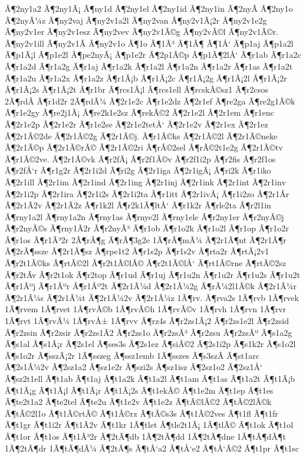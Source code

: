 {Ã¶2ny1a2
Ã¶2ny1Ã¡
Ã¶ny1d
Ã¶2ny1el
Ã¶2ny1id
Ã¶2ny1in
Ã¶2nyÃ­
Ã¶2ny1o
Ã¶2nyÃ¼z
Ã¶ny2vaj
Ã¶ny2v1a2l
Ã¶ny2van
Ã¶ny2v1Ã¡2r
Ã¶ny2v1e2g
Ã¶ny2v1er
Ã¶ny2v1esz
Ã¶ny2vev
Ã¶ny2v1Ã©g
Ã¶ny2vÃ©l
Ã¶ny2v1Ã©r.
Ã¶ny2v1ill
Ã¶ny2v1Ã­
Ã¶ny2v1o
Ã¶1o
Ã¶1Ã³
Ã¶1Ã¶
Ã¶1Å‘
Ã¶p1aj
Ã¶p1a2l
Ã¶p1Ã¡l
Ã¶p1e2l
Ã¶pe2nyÃ¡
Ã¶p1e2r
Ã¶2p1Ã©p
Ã¶p1Ã¶2lÅ‘
Ã¶r1ab
Ã¶r1a2c
Ã¶r1a2d
Ã¶r1a2g
Ã¶r1aj
Ã¶r1a2k
Ã¶r1a2l
Ã¶r1a2n
Ã¶r1a2r
Ã¶r1as
Ã¶r1a2t
Ã¶r1a2u
Ã¶r1a2x
Ã¶r1a2z
Ã¶r1Ã¡b
Ã¶r1Ã¡2c
Ã¶r1Ã¡2g
Ã¶r1Ã¡2l
Ã¶r1Ã¡2r
Ã¶r1Ã¡2s
Ã¶r1Ã¡2t
Ã¶r1br
Ã¶rcs1Ã¡l
Ã¶rcs1ell
Ã¶rcskÃ©sz1
Ã¶r2csos
2Ã¶rdÃ­
Ã¶r1d2r
2Ã¶rdÃ¼
Ã¶2r1e2c
Ã¶r1e2dz
Ã¶2r1ef
Ã¶re2ga
Ã¶re2g1Ã©k
Ã¶r1e2gy
Ã¶re2j1Ã¡
Ã¶re2k1e2sz
Ã¶rekÃ©2
Ã¶2r1e2l
Ã¶2r1em
Ã¶r1enc
Ã¶2r1e2p
Ã¶2r1e2r
Ã¶r1e2se
Ã¶2r1e2tetÅ‘
Ã¶2r1e2v
Ã¶2r1ex
Ã¶2r1ez
Ã¶2r1Ã©2de
Ã¶2r1Ã©2g
Ã¶2r1Ã©j.
Ã¶r1Ã©ks
Ã¶2r1Ã©2l
Ã¶2r1Ã©neke
Ã¶2r1Ã©p
Ã¶2r1Ã©rÃ©
Ã¶2r1Ã©2ri
Ã¶rÃ©2sel
Ã¶rÃ©2t1e2g
Ã¶2r1Ã©tv
Ã¶r1Ã©2ve.
Ã¶2r1Ã©vk
Ã¶r2fÃ¡
Ã¶r2f1Ã©v
Ã¶r2f1i2p
Ã¶r2fis
Ã¶r2f1os
Ã¶r2fÅ‘r
Ã¶r1g2r
Ã¶2r1i2d
Ã¶ri2g
Ã¶2r1iga
Ã¶2r1igÃ¡
Ã¶ri2k
Ã¶r1iko
Ã¶2r1ill
Ã¶2r1im
Ã¶2r1ind
Ã¶2r1ing
Ã¶2r1inj
Ã¶2r1ink
Ã¶2r1int
Ã¶2r1inv
Ã¶2r1i2p
Ã¶2r1ira
Ã¶2r1i2s
Ã¶2r1i2ta
Ã¶r1itt
Ã¶2r1ivÃ¡
Ã¶r1i2zo
Ã¶2r1Ã­r
Ã¶2r1Ã­2v
Ã¶2r1Ã­2z
Ã¶r1k2l
Ã¶r2k1Ã¶ltÅ‘
Ã¶r1k2r
Ã¶rle2ta
Ã¶r2l1in
Ã¶rny1a2l
Ã¶rny1a2n
Ã¶rny1as
Ã¶rnye2l
Ã¶rny1ele
Ã¶r2ny1er
Ã¶r2nyÃ©j
Ã¶r2nyÃ©s
Ã¶rny1Ã­2r
Ã¶r2nyÃ³
Ã¶r1ob
Ã¶r1o2k
Ã¶r1o2l
Ã¶r1op
Ã¶r1o2r
Ã¶r1os
Ã¶r1Ã³2r
2Ã¶rÃ¶g
Ã¶rÃ¶3g2e
1Ã¶rÃ¶mÃ¼
Ã¶2r1Ã¶nt
Ã¶2r1Ã¶r
Ã¶2rÃ¶ssze
Ã¶2r1Ã¶sz
Ã¶rpe1t2
Ã¶r1s2p
Ã¶r1s2v
Ã¶rta2r
Ã¶rtÃ¡2v1
Ã¶r2t1Ã©ks
Ã¶rtÃ©2l
Ã¶r2t1Ã©lÃ©
Ã¶r2t1Ã©lÅ‘
Ã¶rt1Ã©rne
Ã¶rtÃ©2sz
Ã¶r2tÃ­v
Ã¶r2t1ok
Ã¶r2top
Ã¶r1ud
Ã¶r1uj
Ã¶r1u2n
Ã¶r1u2r
Ã¶r1u2s
Ã¶r1u2t
Ã¶r1Ãºj
Ã¶r1Ãºr
Ã¶r1Ãº2t
Ã¶2r1Ã¼d
Ã¶2r1Ã¼2g
Ã¶rÃ¼2l1Ã©k
Ã¶2r1Ã¼r
Ã¶2r1Ã¼s
Ã¶2r1Ã¼t
Ã¶2r1Ã¼2v
Ã¶2r1Ã¼z
1Ã¶rv.
Ã¶rva2s
1Ã¶rvb
1Ã¶rvek
1Ã¶rvem
1Ã¶rvet
1Ã¶rvÃ©b
1Ã¶rvÃ©h
1Ã¶rvÃ©v
1Ã¶rvh
1Ã¶rvn
1Ã¶rvr
1Ã¶rvt
1Ã¶rvÃ¼
1Ã¶rvÅ±
1Ã¶rvv
Ã¶rz4s
Ã¶r2zs1Ã¡2
Ã¶r2zs1e2l
Ã¶r2zsid
Ã¶r2zsin
Ã¶r2zsir
Ã¶r2zs1Ã­2
Ã¶r2zs1o
Ã¶r2zsÃ³
Ã¶r2zsu
Ã¶r2zsÃº
Ã¶s1a2g
Ã¶s1al
Ã¶s1Ã¡r
Ã¶2s1el
Ã¶ses3s
Ã¶2s1ez
Ã¶siÃ©2
Ã¶2s1i2p
Ã¶s1k2r
Ã¶s1o2l
Ã¶s1o2r
Ã¶sszÃ¡2r
1Ã¶sszeg
Ã¶ssz1emb
1Ã¶sszes
Ã¶s3szÃ­
Ã¶st1arc
Ã¶2s1Ã¼2v
Ã¶2sz1a2
Ã¶sz1e2r
Ã¶szi2s
Ã¶sz1isz
Ã¶2sz1o2
Ã¶2sz1Å‘
Ã¶sz2t1ell
Ã¶t1ab
Ã¶t1aj
Ã¶t1a2k
Ã¶t1a2l
Ã¶t1am
Ã¶t1as
Ã¶t1a2t
Ã¶t1Ã¡b
Ã¶t1Ã¡g
Ã¶t1Ã¡l
Ã¶t1Ã¡r
Ã¶t1Ã¡2s
Ã¶t1ekÃ©
Ã¶t1e2m
Ã¶t1ep
Ã¶t1es
Ã¶te2t1a2
Ã¶te2tel
Ã¶te2u
Ã¶t1e2v
Ã¶t1e2z
Ã¶tÃ©lÃ©2
Ã¶tÃ©2lÃ©k
Ã¶tÃ©2l1o
Ã¶t1Ã©rtÃ©
Ã¶t1Ã©rz
Ã¶tÃ©s3s
Ã¶t1Ã©2ves
Ã¶t1fl
Ã¶t1fr
Ã¶t1gr
Ã¶t1i2r
Ã¶t1Ã­2v
Ã¶t1kr
1Ã¶tlet
Ã¶tle2t1Ã¡
1Ã¶tlÃ©
Ã¶t1ok
Ã¶t1ol
Ã¶t1or
Ã¶t1os
Ã¶t1Ã³2r
Ã¶2tÃ¶db
1Ã¶2tÃ¶dd
1Ã¶2tÃ¶dne
1Ã¶tÃ¶dÃ¶t
1Ã¶2tÃ¶dr
1Ã¶tÃ¶dÃ¼
Ã¶2tÃ¶s
Ã¶tÅ‘a2
Ã¶tÅ‘e2
Ã¶tÅ‘Ã©2
Ã¶t1pr
Ã¶t1sc
}
